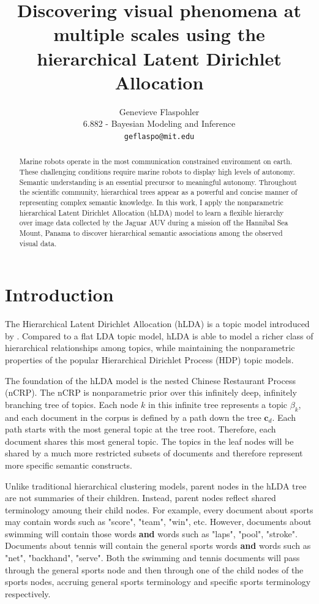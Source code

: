 \documentclass{article}
\title{Discovering visual phenomena at multiple scales using the hierarchical Latent Dirichlet Allocation}
\author{
  Genevieve Flaspohler \\
  6.882 - Bayesian Modeling and Inference\\
  \texttt{geflaspo@mit.edu} \\
}
\begin{document}
\maketitle

\begin{abstract}
Marine robots operate in the most communication constrained environment on earth. These challenging conditions require marine robots to display high levels of autonomy. Semantic understanding is an essential precursor to meaningful autonomy. Throughout the scientific community, hierarchical trees appear as a powerful and concise manner of representing complex semantic knowledge. In this work, I apply the nonparametric hierarchical Latent Dirichlet Allocation (hLDA) model to learn a flexible hierarchy over image data collected by the Jaguar AUV during a mission off the Hannibal Sea Mount, Panama to discover hierarchical semantic associations among the observed visual data. 
\end{abstract}

\section{Introduction}
  The Hierarchical Latent Dirichlet Allocation (hLDA) is a topic model introduced by \cite{Blei2010}. Compared to a flat LDA topic model, hLDA is able to model a richer class of hierarchical relationships among topics, while maintaining the nonparametric properties of the popular Hierarchical Dirichlet Process (HDP) topic models.  

The foundation of the hLDA model is the nested Chinese Restaurant Process (nCRP). The nCRP is nonparametric prior over this infinitely deep, infinitely branching tree of topics. Each node $k$ in this infinite tree represents a topic $\beta_k$, and each document in the corpus is defined by a path down the tree $\mathbf{c}_d$. Each path starts with the most general topic at the tree root. Therefore, each document shares this most general topic. The topics in the leaf nodes will be shared by a much more restricted subsets of documents and therefore represent more specific semantic constructs. 

Unlike traditional hierarchical clustering models, parent nodes in the hLDA tree are not summaries of their children. Instead, parent nodes reflect shared terminology amoung their child nodes. For example, every document about sports may contain words such as "score", "team", "win", etc. However, documents about swimming will contain those words \textbf{and} words such as "laps", "pool", "stroke". Documents about tennis will contain the general sports words \textbf{and} words such as "net", "backhand", "serve".  Both the swimming and tennis documents will pass through the general sports node and then through one of the child nodes of the sports nodes, accruing general sports terminology and specific sports terminology respectively. 
\end{document}
